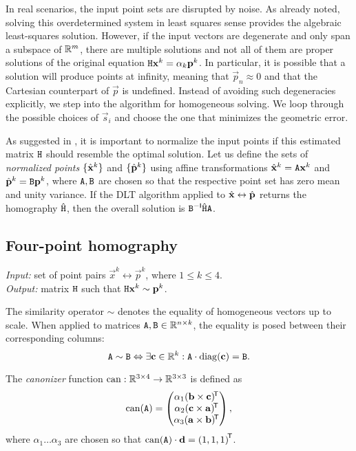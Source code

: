 In real scenarios, the input point sets are disrupted by noise.
As already noted, solving this overdetermined system in least squares sense provides the algebraic least-squares solution.
However, if the input vectors are degenerate and only span a subspace of $\mathbb{R}^m$, there are multiple solutions and not all of them are proper solutions of the original equation $\mathtt{H} \mathbf{x}^k = \alpha_k \mathbf{p}^k$.
In particular, it is possible that a solution will produce points at infinity, meaning that $\vec p_n \approx 0$ and that the Cartesian counterpart of $\vec p$ is undefined.
Instead of avoiding such degeneracies explicitly, we step into the algorithm for homogeneous solving.
We loop through the possible choices of $\vec s_i$ and choose the one that minimizes the geometric error.

As suggested in \cite[p.107]{hartley03}, it is important to normalize the input points if this estimated matrix $\mathtt{H}$ should resemble the optimal solution.
Let us define the sets of \textit{normalized points} $\{ \hat{\mathbf{x}}^k \}$ and $\{ \hat{\mathbf{p}}^k \}$ using affine transformations $\hat{\mathbf{x}}^k = \mathtt{A} \mathbf{x}^k$ and $\hat{\mathbf{p}}^k = \mathtt{B} \mathbf{p}^k$, where $\mathtt{A}, \mathtt{B}$ are chosen so that the respective point set has zero mean and unity variance.
If the DLT algorithm applied to $\hat{\mathbf{x}} \leftrightarrow \hat{\mathbf{p}}$ returns the homography $\hat{\mathtt{H}}$, then the overall solution is $\mathtt{B} ^{-\mathsf{I}} \hat{\mathtt{H}} \mathtt{A}$.

\subsection{Four-point homography}
\label{s:algo-homo}
\textit{Input:} set of point pairs $\vec x^k \leftrightarrow \vec p^k$, where $1 \leq k \leq 4$.\\
\textit{Output:} matrix $\mathtt{H}$ such that $\mathtt{H} \mathbf{x}^k \sim \mathbf{p}^k$.\\

\begin{definition}
The similarity operator $\sim$ denotes the equality of homogeneous vectors up to scale.
When applied to matrices $\mathtt{A}, \mathtt{B} \in \mathbb{R}^{n \times k}$, the equality is posed between their corresponding columns:
$$
\mathtt{A} \sim \mathtt{B} \Leftrightarrow \exists \mathbf{c} \in \mathbb{R}^k : \mathtt{A} \cdot \mathrm{diag}(\mathbf{c}) = \mathtt{B}.
$$
\end{definition}

\begin{definition}
The \textit{canonizer} function $\mathrm{can}: \mathbb{R}^{3\times 4} \to \mathbb{R}^{3\times 3}$ is defined as
$$\mathrm{can}(\mathtt{A}) = \begin{pmatrix}
 \alpha_1 (\mathbf{b} \times \mathbf{c}) ^{\!\mathsf{T}} \\
 \alpha_2 (\mathbf{c} \times \mathbf{a}) ^{\!\mathsf{T}} \\
 \alpha_3 (\mathbf{a} \times \mathbf{b}) ^{\!\mathsf{T}} \\
 \end{pmatrix},
$$
where $\alpha_1 \dots \alpha_3$ are chosen so that $\mathrm{can}(\mathtt{A}) \cdot \mathbf{d} = \left( 1, 1, 1 \right)^{\!\mathsf{T}}$.
\end{definition}

